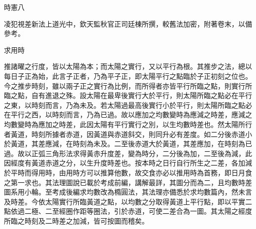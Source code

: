 
\begin{pinyinscope}
時憲八

凌犯視差新法上道光中，欽天監秋官正司廷棟所撰，較舊法加密，附著卷末，以備參考。

求用時

推諸曜之行度，皆以太陽為本；而太陽之實行，又以平行為根。其推步之法，總以每日子正為始，此言子正者，乃為平子正，即太陽平行之點臨於子正初刻之位也。今之推步時刻，雖以兩子正之實行為比例，而所得者亦皆平行所臨之點，則實行所臨之點，自有進退之殊。設太陽在最卑後實行大於平行，則太陽所臨之點必在平行之東，以時刻而言，乃為未及。若太陽過最高後實行小於平行，則太陽所臨之點必在平行之西，以時刻而言，乃為已過。故以應加之均數變時為應減之時差，應減之均數變時為應加之時差，此因太陽有平行實行之別，以生均數時差也。然太陽所行者黃道，時刻所據者赤道，因黃道與赤道斜交，則同升必有差度。如二分後赤道小於黃道，其差應減，在時刻為未及。二至後赤道大於黃道，其差應加，在時刻為已過。故以正弧三角形法求得黃赤升度差，變為時分，二分後為加，二至後為減，此因經度有黃道赤道之分，以生升度時差也。按本時之日行自行所生之二差，各加減於平時而得用時，由用時方可以推算他數，故交食亦必以推用時為首務，即日月食之第一求也。其法理圖說已載於考成前編，講解最詳，其圖分而為二，且均數時差圖系用小輪。至考成後編求均數改為橢圓法，其法理亦備悉於求均數篇內，然未言及時差。今依太陽實行所臨黃道之點，以均數之分取得黃道上平行點，即以平實二點依過二極、二至經圈作距等圈法，引於赤道，可使二差合為一圖。其太陽之經度所臨之時刻及二時差之加減，皆可按圖而稽矣。


\end{pinyinscope}
